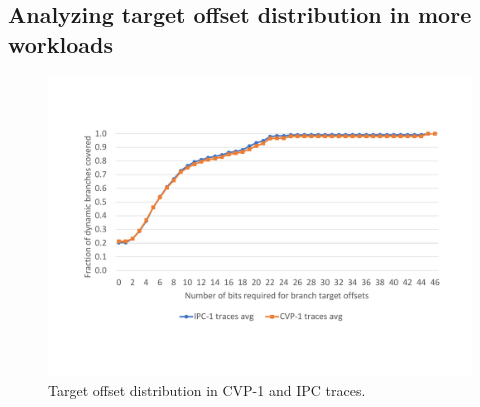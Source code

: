 


\subsection{Analyzing target offset distribution in more workloads}

\begin{figure}
\centering
\includegraphics[width=\columnwidth, trim=70 90 60 100, clip]{figures/CVP-IPC.pdf}
\caption{Target offset distribution in CVP-1 and IPC traces.}
\label{fig:cvp_res}
\end{figure}

